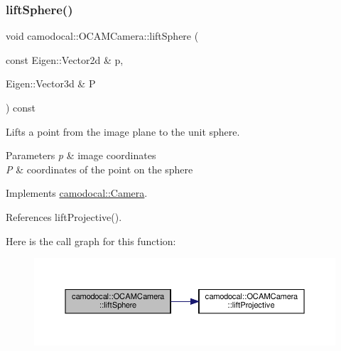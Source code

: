 \subsubsection{\texorpdfstring{lift\+Sphere()}{liftSphere()}}
{\footnotesize\ttfamily void camodocal\+::\+O\+C\+A\+M\+Camera\+::lift\+Sphere (\begin{DoxyParamCaption}\item[{const Eigen\+::\+Vector2d \&}]{p,  }\item[{Eigen\+::\+Vector3d \&}]{P }\end{DoxyParamCaption}) const\hspace{0.3cm}{\ttfamily [virtual]}}



Lifts a point from the image plane to the unit sphere. 


\begin{DoxyParams}{Parameters}
{\em p} & image coordinates \\
\hline
{\em P} & coordinates of the point on the sphere \\
\hline
\end{DoxyParams}


Implements \hyperlink{classcamodocal_1_1Camera_a77b4ea673c694741302efba6f86a0100}{camodocal\+::\+Camera}.



References lift\+Projective().

Here is the call graph for this function\+:\nopagebreak
\begin{figure}[H]
\begin{center}
\leavevmode
\includegraphics[width=350pt]{classcamodocal_1_1OCAMCamera_a48112e1787548fc61c7545fc83ea2c81_cgraph}
\end{center}
\end{figure}
\mbox{\label{classcamodocal_1_1OCAMCamera_a06125c8a4cdf39e0a9353b291802b0ed}} 
